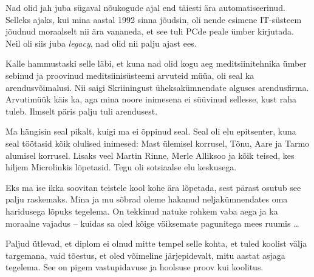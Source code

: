 
Nad olid jah juba sügaval nõukogude ajal end täiesti ära automatiseerinud. 
Selleks 
ajaks, kui mina aastal 1992 sinna jõudsin, oli nende esimene IT-süsteem 
jõudnud moraalselt nii ära vananeda, et see tuli PCde peale ümber 
kirjutada. Neil oli siis juba \emph{legacy}, nad olid nii palju ajast 
ees.


Kalle hammustaski selle läbi, et kuna nad olid kogu 
aeg meditsiinitehnika ümber sebinud ja proovinud meditsiinisüsteemi arvuteid 
müüa, oli seal ka arendusvõimalusi. Nii saigi Skriiningust 
üheksakümnendate alguses arendusfirma. Arvutimüük käis ka, aga mina  
noore inimesena ei süüvinud sellesse, kust raha tuleb. Ilmselt päris palju tuli 
arendusest.



Ma hängisin seal pikalt, kuigi ma ei õppinud seal. Seal oli 
elu epitsenter, kuna seal töötasid kõik olulised inimesed: 
Mast ülemisel korrusel, Tõnu, 
Aare ja Tarmo alumisel 
korrusel. Lisaks veel 
Martin Rinne, Merle Alliksoo ja kõik teised, kes hiljem Microlinkis lõpetasid. Tegu
oli sotsiaalse elu keskusega. 


Eks ma ise ikka soovitan teistele kool kohe 
ära lõpetada, sest pärast osutub see palju raskemaks. Mina ja mu sõbrad oleme 
hakanud 
neljakümnendates oma haridusega lõpuks tegelema. On 
tekkinud natuke rohkem vaba aega ja ka moraalne vajadus --
kuidas sa oled kõige väiksemate pagunitega mees ruumis \ldots


Paljud ütlevad, et diplom ei olnud mitte tempel selle 
kohta, et tuled koolist välja targemana, vaid tõestus, et 
oled võimeline järjepidevalt, mitu aastat asjaga tegelema. See on pigem 
vastupidavuse ja hoolsuse proov kui koolitus.


